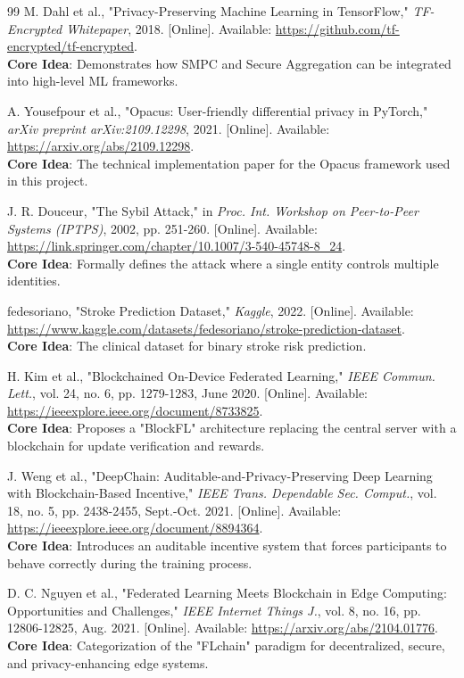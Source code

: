 \documentclass[10pt, a4paper, twocolumn]{article}
\begin{document}
\begin{thebibliography}{99}
 M. Dahl et al., "Privacy-Preserving Machine Learning in TensorFlow," \textit{TF-Encrypted Whitepaper}, 2018. [Online]. Available: \url{https://github.com/tf-encrypted/tf-encrypted}. \\
\textbf{Core Idea}: Demonstrates how SMPC and Secure Aggregation can be integrated into high-level ML frameworks.

 A. Yousefpour et al., "Opacus: User-friendly differential privacy in PyTorch," \textit{arXiv preprint arXiv:2109.12298}, 2021. [Online]. Available: \url{https://arxiv.org/abs/2109.12298}. \\
\textbf{Core Idea}: The technical implementation paper for the Opacus framework used in this project.

 J. R. Douceur, "The Sybil Attack," in \textit{Proc. Int. Workshop on Peer-to-Peer Systems (IPTPS)}, 2002, pp. 251-260. [Online]. Available: \url{https://link.springer.com/chapter/10.1007/3-540-45748-8_24}. \\
\textbf{Core Idea}: Formally defines the attack where a single entity controls multiple identities.

 fedesoriano, "Stroke Prediction Dataset," \textit{Kaggle}, 2022. [Online]. Available: \url{https://www.kaggle.com/datasets/fedesoriano/stroke-prediction-dataset}. \\
\textbf{Core Idea}: The clinical dataset for binary stroke risk prediction.

 H. Kim et al., "Blockchained On-Device Federated Learning," \textit{IEEE Commun. Lett.}, vol. 24, no. 6, pp. 1279-1283, June 2020. [Online]. Available: \url{https://ieeexplore.ieee.org/document/8733825}. \\
\textbf{Core Idea}: Proposes a "BlockFL" architecture replacing the central server with a blockchain for update verification and rewards.

 J. Weng et al., "DeepChain: Auditable-and-Privacy-Preserving Deep Learning with Blockchain-Based Incentive," \textit{IEEE Trans. Dependable Sec. Comput.}, vol. 18, no. 5, pp. 2438-2455, Sept.-Oct. 2021. [Online]. Available: \url{https://ieeexplore.ieee.org/document/8894364}. \\
\textbf{Core Idea}: Introduces an auditable incentive system that forces participants to behave correctly during the training process.

 D. C. Nguyen et al., "Federated Learning Meets Blockchain in Edge Computing: Opportunities and Challenges," \textit{IEEE Internet Things J.}, vol. 8, no. 16, pp. 12806-12825, Aug. 2021. [Online]. Available: \url{https://arxiv.org/abs/2104.01776}. \\
\textbf{Core Idea}: Categorization of the "FLchain" paradigm for decentralized, secure, and privacy-enhancing edge systems.

\end{thebibliography}
\end{document}
